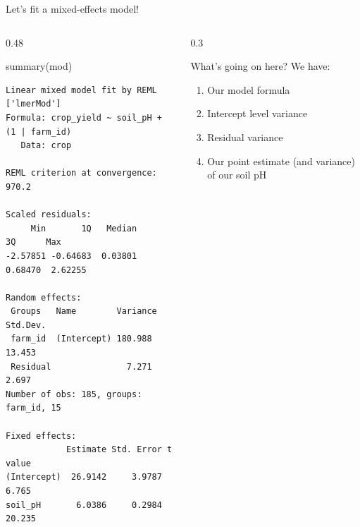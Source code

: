 \documentclass[
  ignorenonframetext,
  aspectratio=169,
]{beamer}
\newenvironment{Shaded}{\begin{snugshade}}{\end{snugshade}}
\newcommand{\FunctionTok}[1]{\textcolor[rgb]{0.28,0.35,0.67}{#1}}
\newcommand{\NormalTok}[1]{\textcolor[rgb]{0.00,0.23,0.31}{#1}}
\providecommand{\tightlist}{%
  \setlength{\itemsep}{0pt}\setlength{\parskip}{0pt}}\usepackage{longtable,booktabs,array}
\begin{document}
\begin{frame}[fragile]{Let's fit a mixed-effects model!}
\label{lets-fit-a-mixed-effects-model-1}
\begin{columns}[T]
\begin{column}{0.48\textwidth}
\begin{Shaded}
\begin{Highlighting}[]
\FunctionTok{summary}\NormalTok{(mod)}
\end{Highlighting}
\end{Shaded}

\begin{center}\begin{minipage}{0.8\linewidth}
\begin{Verbatim}[fontsize=\scriptsize]
Linear mixed model fit by REML ['lmerMod']
Formula: crop_yield ~ soil_pH + (1 | farm_id)
   Data: crop

REML criterion at convergence: 970.2

Scaled residuals: 
     Min       1Q   Median       3Q      Max 
-2.57851 -0.64683  0.03801  0.68470  2.62255 

Random effects:
 Groups   Name        Variance Std.Dev.
 farm_id  (Intercept) 180.988  13.453  
 Residual               7.271   2.697  
Number of obs: 185, groups:  farm_id, 15

Fixed effects:
            Estimate Std. Error t value
(Intercept)  26.9142     3.9787   6.765
soil_pH       6.0386     0.2984  20.235
\end{Verbatim}
\end{minipage}\end{center}
\end{column}

\begin{column}{0.3\textwidth}
\vspace{3.5em}

What's going on here? We have:

\begin{enumerate}
\tightlist
\item
  Our model formula
\item
  Intercept level variance
\item
  Residual variance
\item
  Our point estimate (and variance) of our soil pH
\end{enumerate}
\end{column}
\end{columns}
\end{frame}
\end{document}
